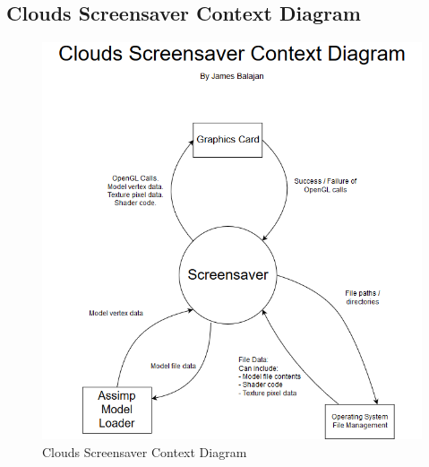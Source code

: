 \documentclass[10pt, openany]{book}
\begin{document}
\subsection{Clouds Screensaver Context Diagram}
\begin{figure}[H]
	\centering
	\includegraphics[width=0.9\linewidth]{Clouds Context Diagram}
	\caption{Clouds Screensaver Context Diagram}
	\label{app:clouds-context}
\end{figure}
\newpage
\end{document}
